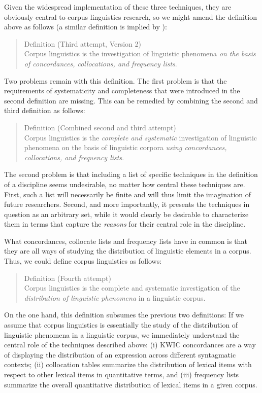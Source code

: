 Given the widespread implementation of these three techniques, they are obviously central to corpus linguistics research, so we might amend the definition above as follows (a similar definition is implied by \citet[244ff.]{kennedy_introduction_1998}):

\begin{quotation}
Definition (Third attempt, Version 2) \\
Corpus linguistics is the investigation of linguistic phenomena \emph{on the basis of concordances, collocations, and frequency lists}.
\end{quotation}

Two problems remain with this definition. The first problem is that the requirements of systematicity and completeness that were introduced in the second definition are missing. This can be remedied by combining the second and third definition as follows:

\begin{quotation}
Definition (Combined second and third attempt) \\
Corpus linguistics is the \emph{complete and systematic} investigation of linguistic phenomena on the basis of linguistic corpora \emph{using concordances, collocations, and frequency lists}.
\end{quotation}

The second problem is that including a list of specific techniques in the definition of a discipline seems undesirable, no matter how central these techniques are. First, such a list will necessarily be finite and will thus limit the imagination of future researchers. Second, and more importantly, it presents the techniques in question as an arbitrary set, while it would clearly be desirable to characterize them in terms that capture the \emph{reasons} for their central role in the discipline.

What concordances, collocate lists and frequency lists have in common is that they are all ways of studying the distribution of linguistic elements in a corpus. Thus, we could define corpus linguistics as follows:

\begin{quotation}
Definition (Fourth attempt) \\
Corpus linguistics is the complete and systematic investigation of the \emph{distribution of linguistic phenomena} in a linguistic corpus.
\end{quotation}

On the one hand, this definition subsumes the previous two definitions: If we assume that corpus linguistics is essentially the study of the distribution of linguistic phenomena in a linguistic corpus, we immediately understand the central role of the techniques described above: (i) KWIC concordances are a way of displaying the distribution of an expression across different syntagmatic contexts; (ii) collocation tables summarize the distribution of lexical items with respect to other lexical items in quantitative terms, and (iii) frequency lists summarize the overall quantitative distribution of lexical items in a given corpus.

